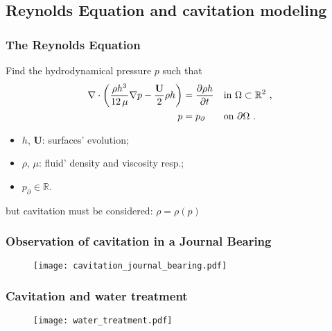 \documentclass[10pt,aspectratio=169]{beamer}
\begin{document}

\subsection{Reynolds Equation and cavitation modeling}


\begin{frame}
\frametitle{The Reynolds Equation}\bigskip
Find the hydrodynamical pressure $p$ such that
\begin{align*}
\nabla \cdot \left( \frac{\rho h^3}{12\,\mu} \nabla p -\frac{\mathbf{U}}{2}\rho h \right) &=\frac{\partial \rho h }{\partial t} &&\text{in } \Omega\subset \mathbb{R}^2~,\\
p&=p_\partial&&\text{on } \partial \Omega~.
\end{align*} 
\begin{itemize}
	\item $h$, $\mathbf{U}$: surfaces' evolution;
	\item $\rho$, $\mu$: fluid' density and viscosity resp.;
	\item $p_\partial\in \mathbb{R}$.
\end{itemize}

\begin{center}
	but cavitation must be considered: $\rho=\rho(p)$
\end{center}
\end{frame}


\begin{frame}[noframenumbering]
\frametitle{Observation of cavitation in a Journal Bearing}
\vspace*{1.0cm}
\begin{figure}
	\centering
	\texttt{[image: cavitation\_journal\_bearing.pdf]}
\end{figure}
\end{frame}


\begin{frame}
\frametitle{Cavitation and water treatment}
\vspace*{0.5cm}
\begin{minipage}{\linewidth}
\begin{figure}
	\texttt{[image: water\_treatment.pdf]}
\end{figure}
\end{minipage}
\end{frame}
\end{document}
